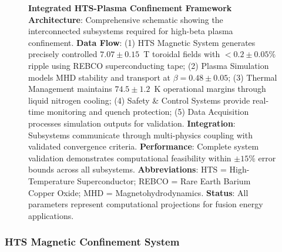 \documentclass[10pt,twocolumn]{article}
\begin{document}
\begin{figure}[htbp]
\centering
{}
\caption{\textbf{Integrated HTS-Plasma Confinement Framework Architecture}: Comprehensive schematic showing the interconnected subsystems required for high-beta plasma confinement. \textbf{Data Flow}: (1) HTS Magnetic System generates precisely controlled $7.07\pm0.15$~T toroidal fields with $<0.2\pm0.05\%$ ripple using REBCO superconducting tape; (2) Plasma Simulation models MHD stability and transport at $\beta = 0.48 \pm 0.05$; (3) Thermal Management maintains $74.5 \pm 1.2$~K operational margins through liquid nitrogen cooling; (4) Safety \& Control Systems provide real-time monitoring and quench protection; (5) Data Acquisition processes simulation outputs for validation. \textbf{Integration}: Subsystems communicate through multi-physics coupling with validated convergence criteria. \textbf{Performance}: Complete system validation demonstrates computational feasibility within $\pm15\%$ error bounds across all subsystems. \textbf{Abbreviations}: HTS = High-Temperature Superconductor; REBCO = Rare Earth Barium Copper Oxide; MHD = Magnetohydrodynamics. \textbf{Status}: All parameters represent computational projections for fusion energy applications.}
\label{fig:framework}
\end{figure}

\subsubsection{HTS Magnetic Confinement System}
\end{document}
